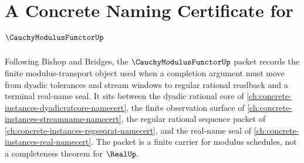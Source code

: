 \chapter{A Concrete Naming Certificate for $\CauchyModulusFunctorUp$}
\label{ch:concrete-instances-cauchy-modulus-functor-namecert}

Following Bishop and Bridges, the $\CauchyModulusFunctorUp$ packet records the finite modulus-transport object used when a completion argument must move from dyadic tolerances and stream windows to regular rational readback and a terminal real-name seal. It sits between the dyadic rational core of \autoref{ch:concrete-instances-dyadicratcore-namecert}, the finite observation surface of \autoref{ch:concrete-instances-streamname-namecert}, the regular rational sequence packet of \autoref{ch:concrete-instances-regseqrat-namecert}, and the real-name seal of \autoref{ch:concrete-instances-real-namecert}. The packet is a finite carrier for modulus schedules, not a completeness theorem for $\RealUp$.

